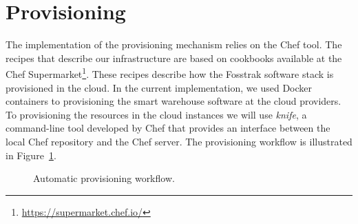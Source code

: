 \section{Provisioning}
\label{sec:provisioning}
The implementation of the provisioning mechanism relies on the Chef tool. The recipes that describe our
infrastructure are based on cookbooks available at the Chef Supermarket\footnote{\url{https://supermarket.chef.io/}}.
These recipes describe how the Fosstrak software stack is provisioned in the cloud. In the current implementation,
we used Docker containers to provisioning the smart warehouse software at the cloud providers. To provisioning
the resources in the cloud instances we will use \textit{knife}, a command-line tool developed by
Chef that provides an interface between the local Chef repository and the Chef server. The provisioning
workflow is illustrated in Figure~\ref{fig:provisioning_tech_architecture}.\\

\begin{figure}
  \centering
  \caption[Automatic provisioning workflow.]{Automatic provisioning workflow.}
  \label{fig:provisioning_tech_architecture}
\end{figure}

